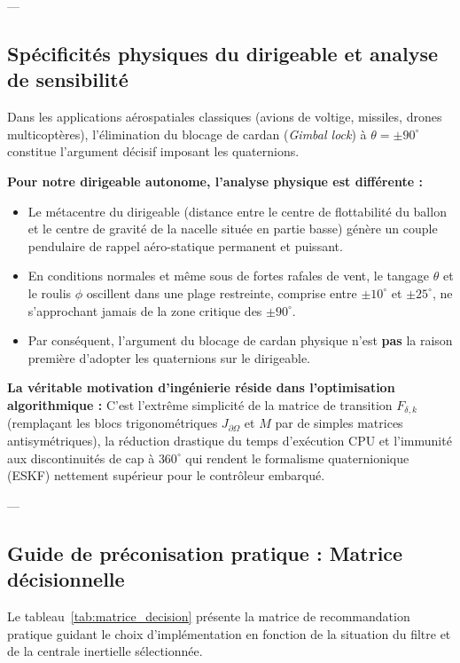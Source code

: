 \documentclass[../Formulations_Kalman.tex]{subfiles}
\begin{document}
---

\subsection{Spécificités physiques du dirigeable et analyse de sensibilité}
Dans les applications aérospatiales classiques (avions de voltige, missiles, drones multicoptères), l'élimination du blocage de cardan (\textit{Gimbal lock}) à $\theta = \pm 90^\circ$ constitue l'argument décisif imposant les quaternions.

\textbf{Pour notre dirigeable autonome, l'analyse physique est différente :}
\begin{itemize}
    \item Le métacentre du dirigeable (distance entre le centre de flottabilité du ballon et le centre de gravité de la nacelle située en partie basse) génère un couple pendulaire de rappel aéro-statique permanent et puissant.
    \item En conditions normales et même sous de fortes rafales de vent, le tangage $\theta$ et le roulis $\phi$ oscillent dans une plage restreinte, comprise entre $\pm 10^\circ$ et $\pm 25^\circ$, ne s'approchant jamais de la zone critique des $\pm 90^\circ$.
    \item Par conséquent, l'argument du blocage de cardan physique n'est \textbf{pas} la raison première d'adopter les quaternions sur le dirigeable.
\end{itemize}

\textbf{La véritable motivation d'ingénierie réside dans l'optimisation algorithmique :}
C'est l'extrême simplicité de la matrice de transition $F_{\delta, k}$ (remplaçant les blocs trigonométriques $J_{\partial\Omega}$ et $M$ par de simples matrices antisymétriques), la réduction drastique du temps d'exécution CPU et l'immunité aux discontinuités de cap à $360^\circ$ qui rendent le formalisme quaternionique (ESKF) nettement supérieur pour le contrôleur embarqué.

---

\subsection{Guide de préconisation pratique : Matrice décisionnelle}
Le tableau~\ref{tab:matrice_decision} présente la matrice de recommandation pratique guidant le choix d'implémentation en fonction de la situation du filtre et de la centrale inertielle sélectionnée.
\end{document}
